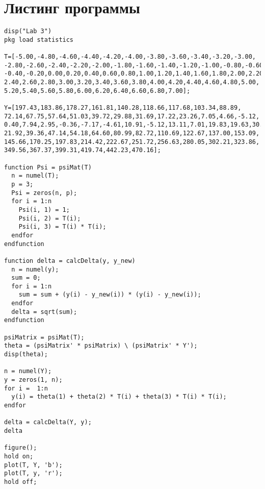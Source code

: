 \begin{figure}[H]
	\center{\texttt{[image: 1]}}
\end{figure}
\newpage

\section{Листинг программы}
\begin{lstlisting}
disp("Lab 3")
pkg load statistics

T=[-5.00,-4.80,-4.60,-4.40,-4.20,-4.00,-3.80,-3.60,-3.40,-3.20,-3.00,
-2.80,-2.60,-2.40,-2.20,-2.00,-1.80,-1.60,-1.40,-1.20,-1.00,-0.80,-0.60,
-0.40,-0.20,0.00,0.20,0.40,0.60,0.80,1.00,1.20,1.40,1.60,1.80,2.00,2.20,
2.40,2.60,2.80,3.00,3.20,3.40,3.60,3.80,4.00,4.20,4.40,4.60,4.80,5.00,
5.20,5.40,5.60,5.80,6.00,6.20,6.40,6.60,6.80,7.00];

Y=[197.43,183.86,178.27,161.81,140.28,118.66,117.68,103.34,88.89,
72.14,67.75,57.64,51.03,39.72,29.88,31.69,17.22,23.26,7.05,4.66,-5.12,
0.40,7.94,2.95,-0.36,-7.17,-4.61,10.91,-5.12,13.11,7.01,19.83,19.63,30.48,
21.92,39.36,47.14,54.18,64.60,80.99,82.72,110.69,122.67,137.00,153.09,
145.66,170.25,197.83,214.42,222.67,251.72,256.63,280.05,302.21,323.86,
349.56,367.37,399.31,419.74,442.23,470.16];

function Psi = psiMat(T)
  n = numel(T);
  p = 3;
  Psi = zeros(n, p);
  for i = 1:n
    Psi(i, 1) = 1;
    Psi(i, 2) = T(i);
    Psi(i, 3) = T(i) * T(i);
  endfor
endfunction

function delta = calcDelta(y, y_new)
  n = numel(y);
  sum = 0;
  for i = 1:n
    sum = sum + (y(i) - y_new(i)) * (y(i) - y_new(i)); 
  endfor
  delta = sqrt(sum);
endfunction

psiMatrix = psiMat(T);
theta = (psiMatrix' * psiMatrix) \ (psiMatrix' * Y');
disp(theta);

n = numel(Y);
y = zeros(1, n);
for i =  1:n
  y(i) = theta(1) + theta(2) * T(i) + theta(3) * T(i) * T(i);
endfor

delta = calcDelta(Y, y);
delta

figure();
hold on;
plot(T, Y, 'b');
plot(T, y, 'r');
hold off;
\end{lstlisting}